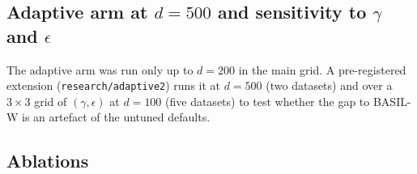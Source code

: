 \documentclass[11pt,a4paper]{article}
\begin{document}
\begin{table}[t]
\centering
\caption{Independent-DAG replication (research/replication2).}
\label{tab:rep2}

\end{table}

\begin{table}[t]
\centering
\caption{Independent-DAG replication: structure, do-effects, calibration and cost.}
\label{tab:rep2b}

\end{table}


\subsection{Adaptive arm at \texorpdfstring{$d=500$}{d=500} and sensitivity to \texorpdfstring{$\gamma$ and $\epsilon$}{gamma and epsilon}}
\label{sec:adaptive2}

The adaptive arm was run only up to $d=200$ in the main grid. A pre-registered extension (\texttt{research/adaptive2}) runs it at $d=500$ (two datasets) and over a $3\times3$ grid of $(\gamma,\epsilon)$ at $d=100$ (five datasets) to test whether the gap to BASIL-W is an artefact of the untuned defaults.

\begin{table}[t]
\centering
\caption{Adaptive arm at $d=500$ and $(\gamma,\epsilon)$ sensitivity (research/adaptive2).}
\label{tab:adaptive2}

\end{table}


\subsection{Ablations}
\label{sec:ablation}

\begin{table}[t]
\centering
\caption{BASIL-W ablations: one change at a time ($d=100$, $n=1000$, uniform noise, 8 test datasets).}
\label{tab:ablation}

\end{table}
\end{document}
